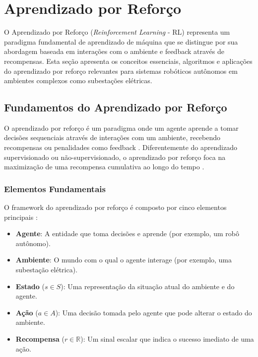 \section{Aprendizado por Reforço}

O Aprendizado por Reforço (\textit{Reinforcement Learning} - RL) representa um paradigma fundamental de aprendizado de máquina que se distingue por sua abordagem baseada em interações com o ambiente e feedback através de recompensas. Esta seção apresenta os conceitos essenciais, algoritmos e aplicações do aprendizado por reforço relevantes para sistemas robóticos autônomos em ambientes complexos como subestações elétricas.

\subsection{Fundamentos do Aprendizado por Reforço}

O aprendizado por reforço é um paradigma onde um agente aprende a tomar decisões sequenciais através de interações com um ambiente, recebendo recompensas ou penalidades como feedback \cite{Sutton2018}. Diferentemente do aprendizado supervisionado ou não-supervisionado, o aprendizado por reforço foca na maximização de uma recompensa cumulativa ao longo do tempo \cite{Arulkumaran2017DeepRL}.

\subsubsection{Elementos Fundamentais}

O framework do aprendizado por reforço é composto por cinco elementos principais \cite{Sutton2018}:

\begin{itemize}
    \item \textbf{Agente}: A entidade que toma decisões e aprende (por exemplo, um robô autônomo).
    \item \textbf{Ambiente}: O mundo com o qual o agente interage (por exemplo, uma subestação elétrica).
    \item \textbf{Estado} ($s \in S$): Uma representação da situação atual do ambiente e do agente.
    \item \textbf{Ação} ($a \in A$): Uma decisão tomada pelo agente que pode alterar o estado do ambiente.
    \item \textbf{Recompensa} ($r \in \mathbb{R}$): Um sinal escalar que indica o sucesso imediato de uma ação.
\end{itemize}

